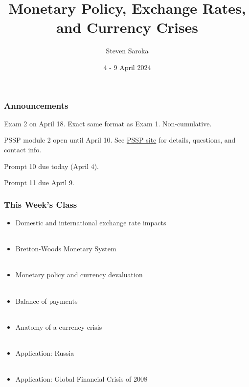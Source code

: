 \documentclass{beamer}
\title[Monetary Policy]{\LARGE{Monetary Policy, Exchange Rates, and Currency Crises}}
\author[POLI 150]{Steven Saroka}
\institute{POLI 150}
\date{4 - 9 April 2024}
\begin{document}
\begin{frame}
\titlepage %
\end{frame}



\begin{frame} 
	\frametitle{\LARGE{Announcements}}
	\begin{itemize}
		\Large{
			\item Exam 2 on April 18. Exact same format as Exam 1. Non-cumulative.
			\item PSSP module 2 open until April 10. See \href{https://tarheels.live/psspparticipants/}{PSSP site} for details, questions, and contact info.
			\item Prompt 10 due today (April 4).
			\item Prompt 11 due April 9.
		}
	\end{itemize}
\end{frame}

\begin{frame} 
	\frametitle{\LARGE{This Week's Class}}
	\begin{itemize}

			\item Domestic and international exchange rate impacts 
			\\~\\ 
			\item Bretton-Woods Monetary System
			\\~\\
			\item Monetary policy and currency devaluation
			\\~\\
			\item Balance of payments
			\\~\\
			\item Anatomy of a currency crisis
			\\~\\
			\item Application: Russia
			\\~\\ 		
			\item Application: Global Financial Crisis of 2008
		
	\end{itemize}
\end{frame}
\end{document}
